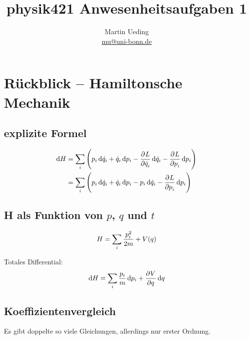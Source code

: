 

\hypersetup{
	pdftitle=
}

\title{physik421 Anwesenheitsaufgaben 1}
\author{
	Martin Ueding \\
	\small{\href{mailto:mu@uni-bonn.de}{mu@uni-bonn.de}}
}



\maketitle

\section{Rückblick -- Hamiltonsche Mechanik}

\subsection{explizite Formel}

\begin{align*}
	\dif H 
	&= \sum_i \del{p_i \dif{\dot q_i} + \dot q_i \dif{p_i} - \dpd L{\dot q_i} \dif{\dot q_i} - \dpd L{p_i} \dif{p_i}} \\
	&= \sum_i \del{p_i \dif{\dot q_i} + \dot q_i \dif{p_i} - p_i \dif{\dot q_i} - \dpd L{p_i} \dif{p_i}} \\
\end{align*}

\subsection{H als Funktion von $p$, $q$ und $t$}

\[
	H = \sum_i \frac{p_i^2}{2m} + V(q) \\
\]

Totales Differential:
\[
	\dif H = \sum_i \frac{p_i}{m} \dif p_i + \dpd Vq \dif q
\]

\subsection{Koeffizientenvergleich}

Es gibt doppelte so viele Gleichungen, allerdings nur erster Ordnung.

%	
%	



